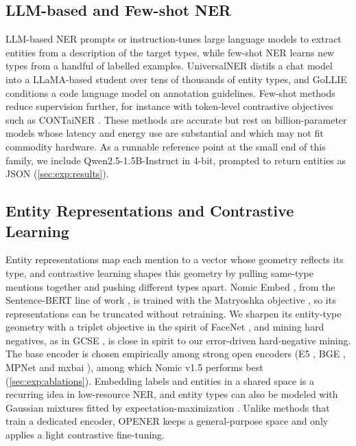 \documentclass[pdflatex,sn-basic,Numbered]{sn-jnl}
\begin{document}
\subsection{LLM-based and Few-shot NER}
\label{sec:related:llm}
{
LLM-based NER prompts or instruction-tunes large language models to extract entities from a description of the target types, while few-shot NER learns new types from a handful of labelled examples.
UniversalNER \cite{zhou2024universalner} distils a chat model into a LLaMA-based student \cite{touvron2023llama} over tens of thousands of entity types, and GoLLIE \cite{sainz2024gollie} conditions a code language model on annotation guidelines.
Few-shot methods reduce supervision further, for instance with token-level contrastive objectives such as CONTaiNER \cite{das2022container}.
These methods are accurate but rest on billion-parameter models whose latency and energy use are substantial and which may not fit commodity hardware.
As a runnable reference point at the small end of this family, we include Qwen2.5-1.5B-Instruct \cite{qwen2025} in 4-bit, prompted to return entities as JSON (\autoref{sec:exp:results}).
\par}

\subsection{Entity Representations and Contrastive Learning}
\label{sec:related:repr}
{
Entity representations map each mention to a vector whose geometry reflects its type, and contrastive learning shapes this geometry by pulling same-type mentions together and pushing different types apart.
Nomic Embed \cite{nussbaum2024nomic}, from the Sentence-BERT line of work \cite{reimers2019sbert}, is trained with the Matryoshka objective \cite{kusupati2022matryoshka}, so its representations can be truncated without retraining.
We sharpen its entity-type geometry with a triplet objective in the spirit of FaceNet \cite{schroff2015facenet}, and mining hard negatives, as in GCSE \cite{lai2025gcse}, is close in spirit to our error-driven hard-negative mining.
The base encoder is chosen empirically among strong open encoders (E5 \cite{wang2022e5}, BGE \cite{xiao2024cpack}, MPNet \cite{song2020mpnet} and mxbai \cite{li2024aoe}), among which Nomic v1.5 performs best (\autoref{sec:exp:ablations}).
Embedding labels and entities in a shared space \cite{wang2018joint} is a recurring idea in low-resource NER, and entity types can also be modeled with Gaussian mixtures fitted by expectation-maximization \cite{dempster1977em}.
Unlike methods that train a dedicated encoder, OPENER keeps a general-purpose space and only applies a light contrastive fine-tuning.
\par}
\end{document}
